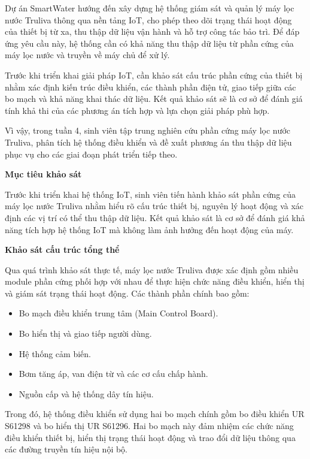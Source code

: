 Dự án SmartWater hướng đến xây dựng hệ thống giám sát và quản lý máy lọc nước Truliva thông qua nền tảng IoT, cho phép theo dõi trạng thái hoạt động của thiết bị từ xa, thu thập dữ liệu vận hành và hỗ trợ công tác bảo trì. Để đáp ứng yêu cầu này, hệ thống cần có khả năng thu thập dữ liệu từ phần cứng của máy lọc nước và truyền về máy chủ để xử lý.

Trước khi triển khai giải pháp IoT, cần khảo sát cấu trúc phần cứng của thiết bị nhằm xác định kiến trúc điều khiển, các thành phần điện tử, giao tiếp giữa các bo mạch và khả năng khai thác dữ liệu. Kết quả khảo sát sẽ là cơ sở để đánh giá tính khả thi của các phương án tích hợp và lựa chọn giải pháp phù hợp.

Vì vậy, trong tuần 4, sinh viên tập trung nghiên cứu phần cứng máy lọc nước Truliva, phân tích hệ thống điều khiển và đề xuất phương án thu thập dữ liệu phục vụ cho các giai đoạn phát triển tiếp theo.

\textbf{Mục tiêu khảo sát}

Trước khi triển khai hệ thống IoT, sinh viên tiến hành khảo sát phần cứng của máy lọc nước Truliva nhằm hiểu rõ cấu trúc thiết bị, nguyên lý hoạt động và xác định các vị trí có thể thu thập dữ liệu. Kết quả khảo sát là cơ sở để đánh giá khả năng tích hợp hệ thống IoT mà không làm ảnh hưởng đến hoạt động của máy.

\vspace{0.5em}

\textbf{Khảo sát cấu trúc tổng thể}

Qua quá trình khảo sát thực tế, máy lọc nước Truliva được xác định gồm nhiều module phần cứng phối hợp với nhau để thực hiện chức năng điều khiển, hiển thị và giám sát trạng thái hoạt động. Các thành phần chính bao gồm:

\begin{itemize}
    \item Bo mạch điều khiển trung tâm (Main Control Board).
    \item Bo hiển thị và giao tiếp người dùng.
    \item Hệ thống cảm biến.
    \item Bơm tăng áp, van điện từ và các cơ cấu chấp hành.
    \item Nguồn cấp và hệ thống dây tín hiệu.
\end{itemize}

Trong đó, hệ thống điều khiển sử dụng hai bo mạch chính gồm bo điều khiển UR S61298 và bo hiển thị UR S61296. Hai bo mạch này đảm nhiệm các chức năng điều khiển thiết bị, hiển thị trạng thái hoạt động và trao đổi dữ liệu thông qua các đường truyền tín hiệu nội bộ.

